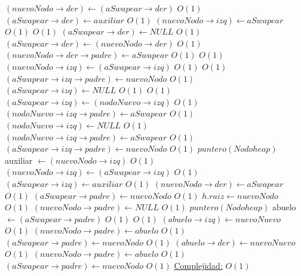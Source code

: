 \begin{Algoritmos}
\begin{algorithmic}[1]
									\State $(nuevoNodo \rightarrow der) \gets (aSwapear \rightarrow der)$ \Comment $O(1)$
									\State $(aSwapear \rightarrow der) \gets auxiliar$ \Comment $O(1)$
								\EndIf
							\EndIf
						\State $(nuevoNodo \rightarrow izq) \gets aSwapear$ \Comment $O(1)$
					\Else
						 \Comment $O(1)$
								\State $(aSwapear \rightarrow der) \gets NULL$ \Comment $O(1)$
							\Else
								\State $(aSwapear \rightarrow der) \gets (nuevoNodo \rightarrow der)$ \Comment $O(1)$
								\State $(nuevoNodo \rightarrow der \rightarrow padre) \gets aSwapear$ \Comment $O(1)$
							\EndIf
							 \Comment $O(1)$
								\State $(nuevoNodo \rightarrow izq) \gets (aSwapear \rightarrow izq)$ \Comment $O(1)$
								 \Comment $O(1)$
									\State $(aSwapear \rightarrow izq \rightarrow padre) \gets nuevoNodo$	\Comment $O(1)$						
								\EndIf
								\State $(aSwapear \rightarrow izq) \gets NULL$ \Comment $O(1)$
							\Else
								 \Comment $O(1)$
									\State $(aSwapear \rightarrow izq) \gets (nodoNuevo \rightarrow izq)$ \Comment $O(1)$
									\State $(nodoNuevo \rightarrow izq \rightarrow padre) \gets aSwapear$ \Comment $O(1)$
									\State $(nodoNuevo \rightarrow izq) \gets NULL$ \Comment $O(1)$
								\Else
									\State $(nodoNuevo \rightarrow izq \rightarrow padre) \gets aSwapear$ \Comment $O(1)$
									\State $(aSwapear \rightarrow izq \rightarrow padre) \gets nuevoNodo$ \Comment $O(1)$
									\State $puntero(Nodoheap)$ auxiliar $\gets (nuevoNodo \rightarrow izq)$ \Comment $O(1)$
									\State $(nuevoNodo \rightarrow izq) \gets (aSwapear \rightarrow izq)$ \Comment $O(1)$
									\State $(aSwapear \rightarrow izq) \gets auxiliar$ \Comment $O(1)$
								\EndIf
							\EndIf
						\State $(nuevoNodo \rightarrow der) \gets aSwapear$ \Comment $O(1)$
					\EndIf	
					\State $(aSwapear \rightarrow padre) \gets nuevoNodo$ \Comment $O(1)$
					\State $h.raiz \gets nuevoNodo$	 \Comment $O(1)$
					\State $(nuevoNodo \rightarrow padre) \gets NULL$			 \Comment $O(1)$
					\Else
					\State $puntero(Nodoheap)$ abuelo $\gets (aSwapear \rightarrow padre)$ \Comment $O(1)$
						 \Comment $O(1)$
							\State $(abuelo \rightarrow izq) \gets nuevoNuevo$ \Comment $O(1)$
							\State $(nuevoNodo \rightarrow padre) \gets abuelo$ \Comment $O(1)$
							\State $(aSwapear \rightarrow padre) \gets nuevoNodo$ \Comment $O(1)$
						\Else
							\State $(abuelo \rightarrow der) \gets nuevoNuevo$ \Comment $O(1)$
							\State $(nuevoNodo \rightarrow padre) \gets abuelo$ \Comment $O(1)$
							\State $(aSwapear \rightarrow padre) \gets nuevoNodo$ \Comment $O(1)$
						\EndIf
					\EndIf
			\medskip
			\Statex \underline{Complejidad:} $O(1)$
    	\end{algorithmic}   
    	
 
    	

\end{Algoritmos}